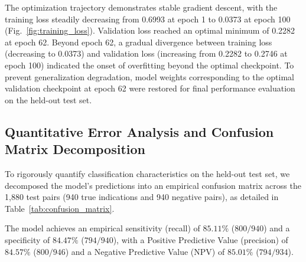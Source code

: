 \documentclass[preprint,12pt]{elsarticle}
\begin{document}
The optimization trajectory demonstrates stable gradient descent, with the training loss steadily decreasing from 0.6993 at epoch 1 to 0.0373 at epoch 100 (Fig.~\ref{fig:training_loss}). Validation loss reached an optimal minimum of 0.2282 at epoch 62. Beyond epoch 62, a gradual divergence between training loss (decreasing to 0.0373) and validation loss (increasing from 0.2282 to 0.2746 at epoch 100) indicated the onset of overfitting beyond the optimal checkpoint. To prevent generalization degradation, model weights corresponding to the optimal validation checkpoint at epoch 62 were restored for final performance evaluation on the held-out test set.

\subsection{Quantitative Error Analysis and Confusion Matrix Decomposition}
To rigorously quantify classification characteristics on the held-out test set, we decomposed the model's predictions into an empirical confusion matrix across the 1,880 test pairs (940 true indications and 940 negative pairs), as detailed in Table~\ref{tab:confusion_matrix}.

\begin{table}[!t]
    \centering
    \renewcommand{\arraystretch}{1.2}
    \caption{Empirical Confusion Matrix on Held-Out Test Set (1,880 Samples)}
    \label{tab:confusion_matrix}
\end{table}

The model achieves an empirical sensitivity (recall) of $85.11\%$ ($800/940$) and a specificity of $84.47\%$ ($794/940$), with a Positive Predictive Value (precision) of $84.57\%$ ($800/946$) and a Negative Predictive Value (NPV) of $85.01\%$ ($794/934$). 
\end{document}
